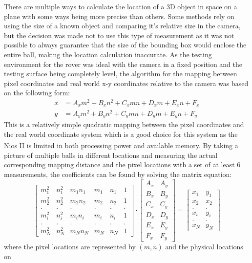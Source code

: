 \documentclass[a4paper]{article}
\begin{document}
There are multiple ways to calculate the location of a 3D object in space on a plane
with some ways being more precise than others. Some methods rely on using the 
size of a known object and comparing it's relative size in the camera, but the 
decision was made not to use this type of measurement as it was not possible to 
always guarantee that the size of the bounding box would enclose the entire ball, 
making the location calculation inaccurate. 
As the testing environment for the rover was ideal with the camera in a fixed 
position and the testing surface being completely level, the algorithm 
for the mapping between pixel coordinates and real world x-y coordinates relative
to the camera was based on the following form: \begin{align*}
    x & = A_x m^2 + B_x n^2 + C_x mn + D_x m + E_x n + F_x \\
    y & = A_y m^2 + B_y n^2 + C_y mn + D_y m + E_y n + F_y  
\end{align*} This is a relatively simple quadratic mapping between the pixel coordinates 
and the real world coordinate system which is a good choice for this system as the 
Nios\textsuperscript{\textregistered} II is limited in both processing power and available memory. 
By taking a picture of multiple balls in different locations and 
measuring the actual corresponding mapping distance and the pixel locations with
a set of at least 6 measurements, 
the coefficients can be found by solving the matrix equation: $$
    \begin{bmatrix}
        m^2_1 & n^2_1 & m_1n_1 & m_1 & n_1 & 1 \\
        m^2_2 & n^2_2 & m_2n_2 & m_2 & n_2 & 1 \\
        .     & .     &    .   &  .  & .   & . \\
        m^2_i & n^2_i & m_in_i & m_i & n_i & 1 \\  
        .     & .     &    .   &  .  & .   & . \\
        m^2_N & n^2_N & m_Nn_N & m_N & n_N & 1  
    \end{bmatrix}
    \cdot
    \begin{bmatrix}
        A_x & A_y \\
        B_x & B_y \\
        C_x & C_y \\
        D_x & D_y \\
        E_x & E_y \\
        F_x & F_y
    \end{bmatrix}
    =
    \begin{bmatrix}
        x_1 & y_1 \\
        x_2 & x_2 \\
        . & . \\
        x_i & y_i \\
        . & . \\
        x_N & y_N
    \end{bmatrix}
$$ where the pixel locations are represented by \((m,n)\) and the physical locations on
\end{document}
